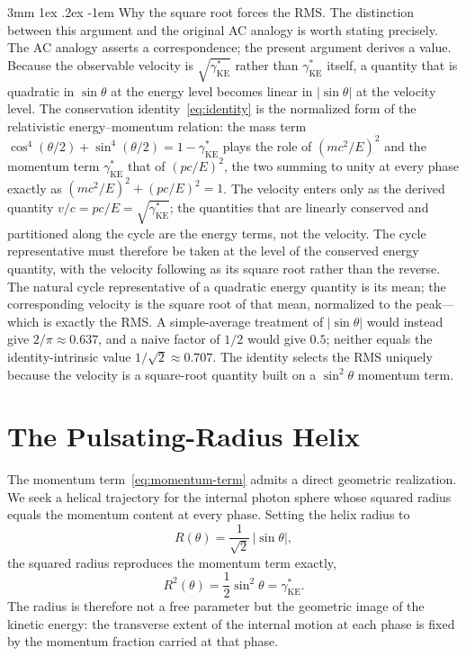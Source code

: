 \documentclass[%
 reprint, amsmath,amssymb, aps, prb, ]{revtex4-2}
\makeatletter
\numberwithin{equation}{section}
\renewcommand\paragraph{%
  \@startsection{paragraph}{4}{\z@}%
    {3mm \@plus 1ex \@minus .2ex}%
    {-1em}%
    {\normalfont\normalsize\itshape}}
\newcommand{\gKE}{\gamma^{*}_{\text{KE}}}
\makeatother
\begin{document}
\paragraph{Why the square root forces the RMS.}
The distinction between this argument and the original AC analogy is worth stating precisely. The AC analogy asserts a correspondence; the present argument derives a value. Because the observable velocity is $\sqrt{\gKE}$ rather than $\gKE$ itself, a quantity that is quadratic in $\sin\theta$ at the energy level becomes linear in $\lvert\sin\theta\rvert$ at the velocity level. The conservation identity~\eqref{eq:identity} is the normalized form of the relativistic energy--momentum relation: the mass term $\cos^4(\theta/2)+\sin^4(\theta/2)=1-\gKE$ plays the role of $(mc^2/E)^2$ and the momentum term $\gKE$ that of $(pc/E)^2$, the two summing to unity at every phase exactly as $(mc^2/E)^2+(pc/E)^2=1$. The velocity enters only as the derived quantity $v/c=pc/E=\sqrt{\gKE}$; the quantities that are linearly conserved and partitioned along the cycle are the energy terms, not the velocity. The cycle representative must therefore be taken at the level of the conserved energy quantity, with the velocity following as its square root rather than the reverse. The natural cycle representative of a quadratic energy quantity is its mean; the corresponding velocity is the square root of that mean, normalized to the peak---which is exactly the RMS. A simple-average treatment of $\lvert\sin\theta\rvert$ would instead give $2/\pi\approx0.637$, and a naive factor of $1/2$ would give $0.5$; neither equals the identity-intrinsic value $1/\sqrt{2}\approx0.707$. The identity selects the RMS uniquely because the velocity is a square-root quantity built on a $\sin^2\theta$ momentum term.

\section{The Pulsating-Radius Helix}
\label{sec:helix}

The momentum term~\eqref{eq:momentum-term} admits a direct geometric realization. We seek a helical trajectory for the internal photon sphere whose squared radius equals the momentum content at every phase. Setting the helix radius to
\begin{equation}
R(\theta) = \frac{1}{\sqrt{2}}\,\lvert\sin\theta\rvert,
\label{eq:radius}
\end{equation}
the squared radius reproduces the momentum term exactly,
\begin{equation}
R^2(\theta) = \frac{1}{2}\sin^2\theta = \gKE .
\label{eq:R2}
\end{equation}
The radius is therefore not a free parameter but the geometric image of the kinetic energy: the transverse extent of the internal motion at each phase is fixed by the momentum fraction carried at that phase.
\end{document}

